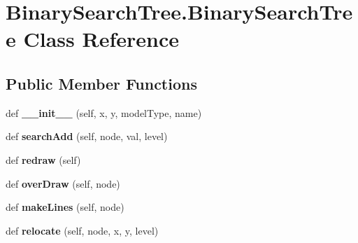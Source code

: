 \hypertarget{class_binary_search_tree_1_1_binary_search_tree}{}\section{Binary\+Search\+Tree.\+Binary\+Search\+Tree Class Reference}
\label{class_binary_search_tree_1_1_binary_search_tree}
\subsection*{Public Member Functions}
\begin{DoxyCompactItemize}
\item 
\mbox{\label{class_binary_search_tree_1_1_binary_search_tree_a427e86bf2d372a1b518489843bc85103}} 
def {\bfseries \+\_\+\+\_\+init\+\_\+\+\_\+} (self, x, y, model\+Type, name)
\item 
\mbox{\label{class_binary_search_tree_1_1_binary_search_tree_a5168edcb8e13e75c4d9f9d016cf922e0}} 
def {\bfseries search\+Add} (self, node, val, level)
\item 
\mbox{\label{class_binary_search_tree_1_1_binary_search_tree_a590449bc083a03f8746362ae21081c6b}} 
def {\bfseries redraw} (self)
\item 
\mbox{\label{class_binary_search_tree_1_1_binary_search_tree_a78d7a635850da8941d434365d6447f75}} 
def {\bfseries over\+Draw} (self, node)
\item 
\mbox{\label{class_binary_search_tree_1_1_binary_search_tree_a64a520f74e40f705873893befbe905c3}} 
def {\bfseries make\+Lines} (self, node)
\item 
\mbox{\label{class_binary_search_tree_1_1_binary_search_tree_ae3acf8c976ea9f9dd05d381954c430ed}} 
def {\bfseries relocate} (self, node, x, y, level)
\item 
\mbox{\label{class_binary_search_tree_1_1_binary_search_tree_ab410c124ca03f9cb2f8b7f72a1529196}} 

\end{DoxyCompactItemize}
